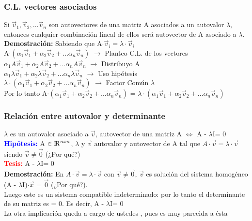 \documentclass{article}
\begin{document}
\subsubsection{C.L. vectores asociados}
Si $\vec{v}_1, \vec{v}_2, \ldots \vec{v}_n$ son autovectores de una matriz A asociados a un autovalor $\lambda$, entonces cualquier combinación lineal de ellos será autovector de A asociado a $\lambda$. \\
\textbf{Demostración:} Sabiendo que A$\cdot\vec{v}_i = \lambda\cdot\vec{v}_i$\\
A$\cdot( \alpha_1\vec{v}_1 + \alpha_2\vec{v}_2 + \ldots \alpha_n\vec{v}_n )$ $\rightarrow$ Planteo C.L. de los vectores\\ 
$ \alpha_1A\vec{v}_1 + \alpha_2A\vec{v}_2 + \ldots \alpha_nA\vec{v}_n$ $\rightarrow$ Distribuyo A\\
$ \alpha_1\lambda\vec{v}_1 + \alpha_2\lambda\vec{v}_2 + \ldots \alpha_n\lambda\vec{v}_n$  $\rightarrow$ Uso hipótesis\\
$\lambda \cdot(\alpha_1\vec{v}_1 + \alpha_2\vec{v}_2 + \ldots \alpha_n\vec{v}_n)$ $\rightarrow$ Factor Común $\lambda$\\
Por lo tanto A$\cdot( \alpha_1\vec{v}_1 + \alpha_2\vec{v}_2 + \ldots \alpha_n\vec{v}_n )$ = $\lambda \cdot(\alpha_1\vec{v}_1 + \alpha_2\vec{v}_2 + \ldots \alpha_n\vec{v}_n)$
\subsubsection{Relación entre autovalor y determinante}
$\lambda$ es un autovalor asociado a $\vec{v}$, autovector de una matriz A $\Leftrightarrow$ \textbar  A - $\lambda$I\textbar = 0\\
{\bfseries \textcolor{blue}{Hipótesis:}} A $\in {\rm I\!R}^{nxn}$, $\lambda$ y $\vec{v}$ autovalor y autovector de A tal que $A\cdot\vec{v} = \lambda\cdot\vec{v}$ siendo $\vec{v} \neq \vec{0}$ (¿Por qué?)\\
{\bfseries \textcolor{red}{Tesis:}} \textbar  A - $\lambda$I\textbar = 0\\
\textbf{Demostración:} En $A\cdot\vec{v} = \lambda\cdot\vec{v}$ con  $\vec{v} \neq \vec{0}$, $\vec{v}$ es solución del sistema homogéneo (A - $\lambda$I)$\cdot\vec{x}$ = $\vec{0}$ (¿Por qué?).\\
Luego este es un sistema compatible indeterminado: por lo tanto el determinante de su matriz es = 0. Es decir, \textbar  A - $\lambda$I\textbar = 0\\
La otra implicación queda a cargo de ustedes ,
pues es muy parecida a ésta
\end{document}
